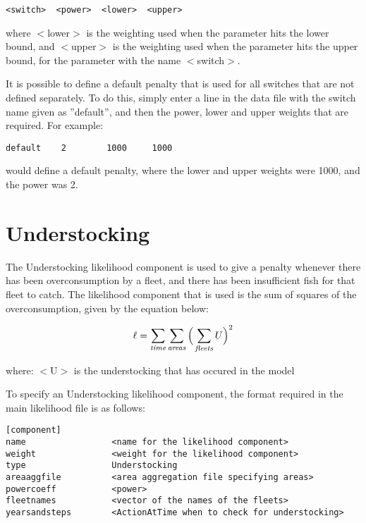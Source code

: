 \documentclass [a4paper, 10pt]{book}
\begin{document}
\begin{verbatim}
<switch>  <power>  <lower>  <upper>
\end{verbatim}

where $<$lower$>$ is the weighting used when the parameter hits the lower bound, and $<$upper$>$ is the weighting used when the parameter hits the upper bound, for the parameter with the name $<$switch$>$.

\bigskip
It is possible to define a default penalty that is used for all switches that are not defined separately.  To do this, simply enter a line in the data file with the switch name given as ''default'', and then the power, lower and upper weights that are required.  For example:

\begin{verbatim}
default    2        1000     1000
\end{verbatim}

would define a default penalty, where the lower and upper weights were 1000, and the power was 2.

\section{Understocking}\label{sec:understocking}
The Understocking likelihood component is used to give a penalty whenever there has been overconsumption by a fleet, and there has been insufficient fish for that fleet to catch.  The likelihood component that is used is the sum of squares of the overconsumption, given by the equation below:

\begin{equation}\label{eq:understocking}
\ell = \sum_{\it time}\sum_{\it areas} \Big(\sum_{\it fleets} U \Big)^2
\end{equation}

where:\newline
$<$U$>$ is the understocking that has occured in the model

\bigskip
To specify an Understocking likelihood component, the format required in the main likelihood file is as follows:

\begin{verbatim}
[component]
name                 <name for the likelihood component>
weight               <weight for the likelihood component>
type                 Understocking
areaaggfile          <area aggregation file specifying areas>
powercoeff           <power>
fleetnames           <vector of the names of the fleets>
yearsandsteps        <ActionAtTime when to check for understocking>
\end{verbatim}
\end{document}
